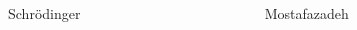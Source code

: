 \documentclass[9pt]{beamer}
\begin{document}
\begin{frame}
\begin{columns}
\begin{column}{.49\textwidth}
\begin{block}{Schrödinger}
\end{block}
\end{column}
\begin{column}{.49\textwidth}
\begin{block}{Mostafazadeh}
\end{block}
\end{column}
\end{columns}
\end{frame}
\end{document}
